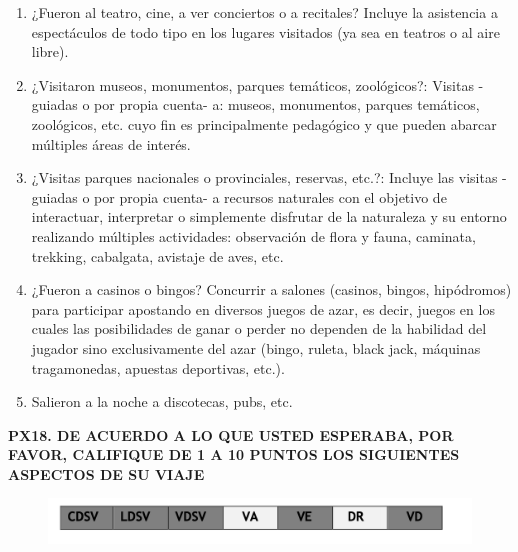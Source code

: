 \documentclass[
  openany]{book}
\begin{document}
\begin{enumerate}
\item
  ¿Fueron al teatro, cine, a ver conciertos o a recitales? Incluye la asistencia a espectáculos de todo tipo en los lugares visitados (ya sea en teatros o al aire libre).
\item
  ¿Visitaron museos, monumentos, parques temáticos, zoológicos?: Visitas -guiadas o por propia cuenta- a: museos, monumentos, parques temáticos, zoológicos, etc. cuyo fin es principalmente pedagógico y que pueden abarcar múltiples áreas de interés.
\item
  ¿Visitas parques nacionales o provinciales, reservas, etc.?: Incluye las visitas -guiadas o por propia cuenta- a recursos naturales con el objetivo de interactuar, interpretar o simplemente disfrutar de la naturaleza y su entorno realizando múltiples actividades: observación de flora y fauna, caminata, trekking, cabalgata, avistaje de aves, etc.
\item
  ¿Fueron a casinos o bingos? Concurrir a salones (casinos, bingos, hipódromos) para participar apostando en diversos juegos de azar, es decir, juegos en los cuales las posibilidades de ganar o perder no dependen de la habilidad del jugador sino exclusivamente del azar (bingo, ruleta, black jack, máquinas tragamonedas, apuestas deportivas, etc.).
\item
  Salieron a la noche a discotecas, pubs, etc.
\end{enumerate}

\textbf{PX18. DE ACUERDO A LO QUE USTED ESPERABA, POR FAVOR, CALIFIQUE DE 1 A 10 PUNTOS LOS SIGUIENTES ASPECTOS DE SU VIAJE}

\begin{figure}

{\centering \includegraphics[width=1\linewidth]{imagenes/figura6-115} 

}

\end{figure}
\end{document}
